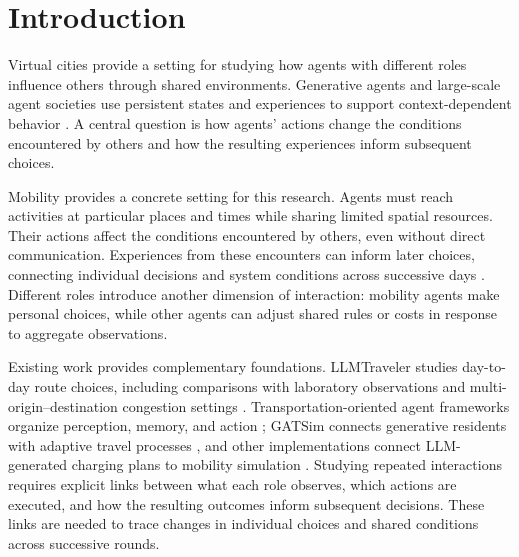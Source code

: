 
\section{Introduction}
\label{sec:introduction}
Virtual cities provide a setting for studying how agents
with different roles influence others through shared
environments. Generative agents and large-scale agent
societies use persistent states and experiences to support
context-dependent behavior \cite{park2023generative,piao2025agentsociety}.
A central question is how agents' actions change the
conditions encountered by others and how the resulting
experiences inform subsequent choices.

Mobility provides a concrete setting for this research. Agents must reach activities at particular places and times while sharing limited spatial resources. Their actions affect the conditions encountered by others, even without direct communication. Experiences from these encounters can inform later choices, connecting individual decisions and system conditions across successive days \cite{cantarella1995dynamic,ye2015learning}. Different roles introduce another dimension of interaction: mobility agents make personal choices, while other agents can adjust shared rules or costs in response to aggregate observations.


Existing work provides complementary foundations. LLMTraveler studies day-to-day route choices, including comparisons with laboratory observations and multi-origin--destination congestion settings \cite{wang2025agentic}. Transportation-oriented agent frameworks organize perception, memory, and action \cite{liu2024transport}; GATSim connects generative residents with adaptive travel processes \cite{liu2026gatsim}, and other implementations connect LLM-generated charging plans to mobility simulation \cite{patwary2026bridging}. 
Studying repeated interactions requires explicit links between
what each role observes, which actions are executed, and how
the resulting outcomes inform subsequent decisions. These
links are needed to trace changes in individual choices
and shared conditions across successive rounds.




